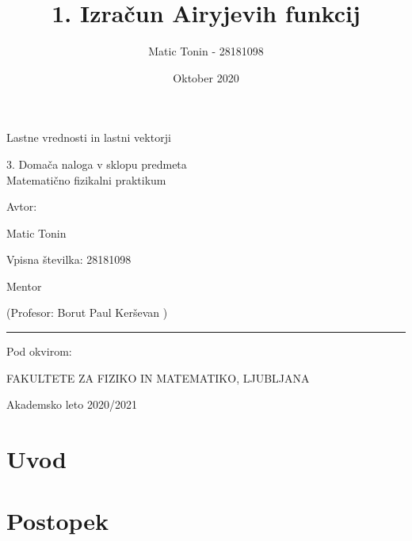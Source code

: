 \documentclass{article}
\title{1. Izračun Airyjevih funkcij}
\author{Matic Tonin - 28181098 }
\date{Oktober 2020}
\begin{document}
\begin{center}
\thispagestyle{empty}
\parskip=14pt%
\vspace*{3\parskip}%
\begin{Huge}Lastne vrednosti in lastni vektorji \end{Huge}


3. Domača naloga v sklopu predmeta \\
Matematično fizikalni praktikum

Avtor:

Matic Tonin

Vpisna številka: 28181098

Mentor 

(Profesor: Borut Paul Kerševan )

\rule{7cm}{0.4pt}

Pod okvirom:

FAKULTETE ZA FIZIKO IN MATEMATIKO, LJUBLJANA

Akademsko leto 2020/2021

\end{center}
\pagebreak


\newpage

\section{Uvod}

\section{Postopek}
\end{document}
